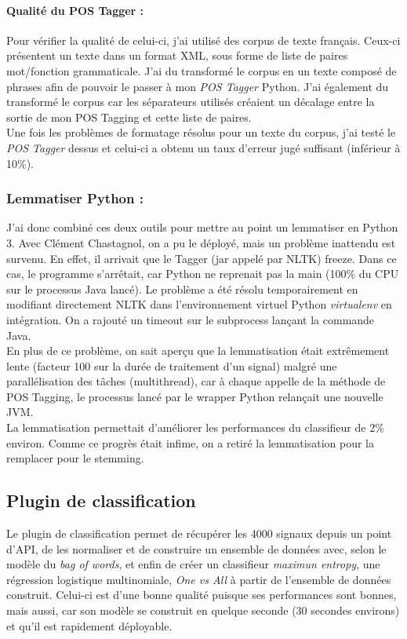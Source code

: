             \paragraph{Qualité du POS Tagger :}
                Pour vérifier la qualité de celui-ci, j'ai utilisé des corpus de texte français. Ceux-ci présentent un texte dans un format XML, sous forme de liste de paires mot/fonction grammaticale. J'ai du transformé le corpus en un texte composé de phrases afin de pouvoir le passer à mon \textit{POS Tagger} Python. J'ai également du transformé le corpus car les séparateurs utilisés créaient un décalage entre la sortie de mon POS Tagging et cette liste de paires.\\
                Une fois les problèmes de formatage résolus pour un texte du corpus, j'ai testé le \textit{POS Tagger} dessus et celui-ci a obtenu un taux d'erreur jugé suffisant (inférieur à 10\%).

        \subsubsection{Lemmatiser Python :}
            J'ai donc combiné ces deux outils pour mettre au point un lemmatiser en Python 3. Avec Clément Chastagnol, on a pu le déployé, mais un problème inattendu est survenu. En effet, il arrivait que le Tagger (jar appelé par NLTK) freeze. Dans ce cas, le programme s'arrêtait, car Python ne reprenait pas la main (100\% du CPU sur le processus Java lancé). Le problème a été résolu temporairement en modifiant directement NLTK dans l'environnement virtuel Python \textit{virtualenv} en intégration. On a rajouté un timeout sur le subprocess lançant la commande Java.\\

            En plus de ce problème, on sait aperçu que la lemmatisation était extrêmement lente (facteur 100 sur la durée de traitement d'un signal) malgré une parallélisation des tâches (multithread), car à chaque appelle de la méthode de POS Tagging, le processus lancé par le wrapper Python relançait une nouvelle JVM.\\

            La lemmatisation permettait d'améliorer les performances du classifieur de 2\% environ. Comme ce progrès était infime, on a retiré la lemmatisation pour la remplacer pour le stemming.


    \subsection{Plugin de classification}
        Le plugin de classification permet de récupérer les 4000 signaux depuis un point d'API, de les normaliser et de construire un ensemble de données avec, selon le modèle du \textit{bag of words}, et enfin de créer un classifieur \textit{maximun entropy}, une régression logistique multinomiale, \textit{One vs All} à partir de l'ensemble de données construit. Celui-ci est d'une bonne qualité puisque ses performances sont bonnes, mais aussi, car son modèle se construit en quelque seconde (30 secondes environs) et qu'il est rapidement déployable.\\

